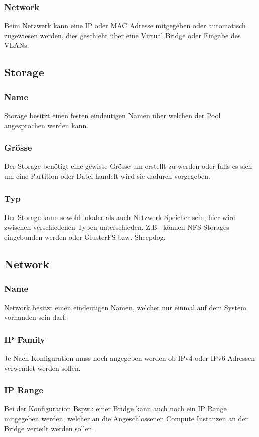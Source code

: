 \subsubsection{Network}
Beim Netzwerk kann eine IP oder MAC Adresse mitgegeben oder automatisch zugewiesen 
werden, dies geschieht über eine Virtual Bridge oder Eingabe des VLANs.

\subsection{Storage}
\subsubsection{Name}
Storage besitzt einen festen eindeutigen Namen über welchen der Pool angesprochen 
werden kann.
\subsubsection{Grösse}
Der Storage benötigt eine gewisse Grösse um erstellt zu werden oder falls es 
sich um eine Partition oder Datei handelt wird sie dadurch vorgegeben.

\subsubsection{Typ}
Der Storage kann sowohl lokaler als auch Netzwerk Speicher sein, hier wird 
zwischen verschiedenen Typen unterschieden.
Z.B.: können NFS Storages eingebunden werden oder GlusterFS bzw. Sheepdog.

\subsection{Network}
\subsubsection{Name}
Network besitzt einen eindeutigen Namen, welcher nur einmal auf dem System 
vorhanden sein darf.

\subsubsection{IP Family}
Je Nach  Konfiguration muss noch angegeben werden ob IPv4 oder IPv6 Adressen 
verwendet werden sollen.

\subsubsection{IP Range}
Bei der Konfiguration Bspw.: einer Bridge kann auch noch ein IP Range mitgegeben 
werden, welcher an die Angeschlossenen Compute Instanzen an der Bridge verteilt 
werden sollen.
